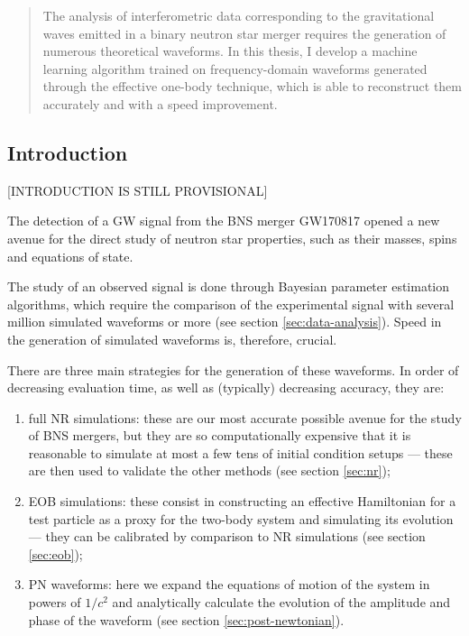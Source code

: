 \documentclass[main.tex]{subfiles}
\begin{document}
\begin{abstract}
The analysis of interferometric data corresponding to the gravitational waves emitted in a binary neutron star merger requires the generation of numerous theoretical waveforms.
In this thesis, I develop a machine learning algorithm trained on frequency-domain waveforms generated through the effective one-body technique, which is able to reconstruct them accurately and with a speed improvement.
\end{abstract}




\subsection*{Introduction}

[INTRODUCTION IS STILL PROVISIONAL]

The detection of a \ac{GW} signal from the \ac{BNS} merger GW170817 \cite{abbottGW170817ObservationGravitational2017} opened a new avenue for the direct study of neutron star properties, such as their masses, spins and equations of state.

The study of an observed signal is done through Bayesian parameter estimation algorithms, which require the comparison of the experimental signal with several million \cite{lackeyEffectiveonebodyWaveformsBinary2017} simulated waveforms or more (see section \ref{sec:data-analysis}).
Speed in the generation of simulated waveforms is, therefore, crucial.

There are three main strategies for the generation of these waveforms. In order of decreasing evaluation time, as well as (typically) decreasing accuracy, they are:
\begin{enumerate}
    \item full \ac{NR} simulations: these are our most accurate possible avenue for the study of \ac{BNS} mergers, but they are so computationally expensive that it is reasonable to simulate at most a few tens of initial condition setups --- these are then used to validate the other methods (see section \ref{sec:nr});
    \item \ac{EOB} simulations: these consist in constructing an effective Hamiltonian for a test particle as a proxy for the two-body system and simulating its evolution --- they can be calibrated by comparison to \ac{NR} simulations (see section \ref{sec:eob});
    \item \ac{PN} waveforms: here we expand the equations of motion of the system in powers of $1/c^2$ and analytically calculate the evolution of the amplitude and phase of the waveform (see section \ref{sec:post-newtonian}).
\end{enumerate}
\end{document}
